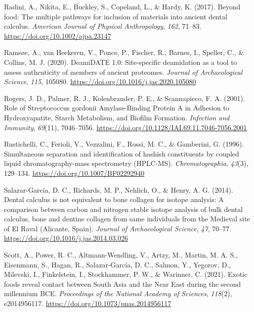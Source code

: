 \documentclass[
  b5paper,
]{book}
\newlength{\cslhangindent}
\newenvironment{CSLReferences}[2] %
 {\begin{list}{}{%
  \setlength{\itemindent}{0pt}
  \setlength{\leftmargin}{0pt}
  \setlength{\parsep}{0pt}
  \ifodd #1
   \setlength{\leftmargin}{\cslhangindent}
   \setlength{\itemindent}{-1\cslhangindent}
  \fi
  \setlength{\itemsep}{#2\baselineskip}}}
 {\end{list}}
\begin{document}
\begin{CSLReferences}{1}{0}
Radini, A., Nikita, E., Buckley, S., Copeland, L., \& Hardy, K. (2017).
Beyond food: {The} multiple pathways for inclusion of materials into
ancient dental calculus. \emph{American Journal of Physical
Anthropology}, \emph{162}, 71--83.
\url{https://doi.org/10.1002/ajpa.23147}

Ramsøe, A., van Heekeren, V., Ponce, P., Fischer, R., Barnes, I.,
Speller, C., \& Collins, M. J. (2020). {DeamiDATE} 1.0: {Site-specific}
deamidation as a tool to assess authenticity of members of ancient
proteomes. \emph{Journal of Archaeological Science}, \emph{115}, 105080.
\url{https://doi.org/10.1016/j.jas.2020.105080}

Rogers, J. D., Palmer, R. J., Kolenbrander, P. E., \& Scannapieco, F. A.
(2001). Role of {Streptococcus} gordonii {Amylase-Binding Protein A} in
{Adhesion} to {Hydroxyapatite}, {Starch Metabolism}, and {Biofilm
Formation}. \emph{Infection and Immunity}, \emph{69}(11), 7046--7056.
\url{https://doi.org/10.1128/IAI.69.11.7046-7056.2001}

Rustichelli, C., Ferioli, V., Vezzalini, F., Rossi, M. C., \& Gamberini,
G. (1996). Simultaneous separation and identification of hashish
constituents by coupled liquid chromatography-mass spectrometry
({HPLC-MS}). \emph{Chromatographia}, \emph{43}(3), 129--134.
\url{https://doi.org/10.1007/BF02292940}

Salazar-García, D. C., Richards, M. P., Nehlich, O., \& Henry, A. G.
(2014). Dental calculus is not equivalent to bone collagen for isotope
analysis: A comparison between carbon and nitrogen stable isotope
analysis of bulk dental calculus, bone and dentine collagen from same
individuals from the {Medieval} site of {El Raval} ({Alicante},
{Spain}). \emph{Journal of Archaeological Science}, \emph{47}, 70--77.
\url{https://doi.org/10.1016/j.jas.2014.03.026}

Scott, A., Power, R. C., Altmann-Wendling, V., Artzy, M., Martin, M. A.
S., Eisenmann, S., Hagan, R., Salazar-García, D. C., Salmon, Y.,
Yegorov, D., Milevski, I., Finkelstein, I., Stockhammer, P. W., \&
Warinner, C. (2021). Exotic foods reveal contact between {South Asia}
and the {Near East} during the second millennium {BCE}.
\emph{Proceedings of the National Academy of Sciences}, \emph{118}(2),
e2014956117. \url{https://doi.org/10.1073/pnas.2014956117}


\end{CSLReferences}
\end{document}
